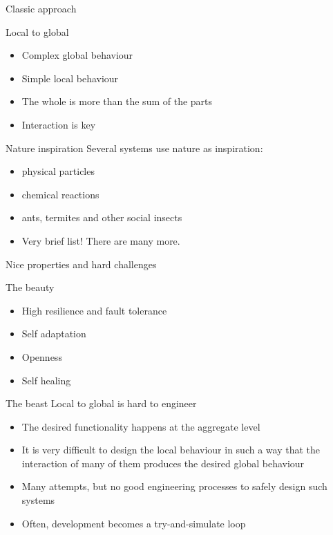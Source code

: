 \documentclass[presentation]{beamer} %
\begin{document}
\begin{frame}{Classic approach}
\begin{block}{Local to global}
  \begin{itemize}
    \item Complex global behaviour
    \item Simple local behaviour
    \item The whole is more than the sum of the parts
    \item Interaction is key
  \end{itemize}
\end{block}
\begin{block}{Nature inspiration}
   Several systems use nature as inspiration:
  \begin{itemize}
    \item physical particles \cite{mamei2009acm}
    \item chemical reactions \cite{sapere-procedia7}
    \item ants, termites and other social insects \cite{swarmlinda}
    \item Very brief list! There are many more.
  \end{itemize}
\end{block}
\end{frame}

\begin{frame}{Nice properties and hard challenges}
  \begin{block}{The beauty}
    \begin{itemize}
      \item High resilience and fault tolerance
      \item Self adaptation
      \item Openness
      \item Self healing
    \end{itemize}
  \end{block}
  \begin{block}{The beast}
    Local to global is hard to engineer
    \begin{itemize}
      \item The desired functionality happens at the aggregate level
      \item It is very difficult to design the local behaviour in such a way that the interaction of many of them produces the desired global behaviour
      \item Many attempts, but no good engineering processes to safely design such systems
      \item Often, development becomes a try-and-simulate loop
    \end{itemize}
  \end{block}
\end{frame}
\end{document}
